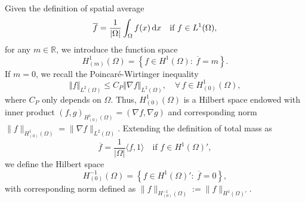 \documentclass[11pt,reqno]{amsart}
\theoremstyle{remark}
\newcommand \norm[1] {\left\Vert #1\right\Vert}
\def\d{{\rm d}}
\def \l {\langle}
\def \r {\rangle}
\numberwithin{equation}{section}
\def\d{{\rm d}}
\begin{document}
Given the definition of spatial average
\begin{equation*}
\overline{f}= \frac{1}{|\Omega|} \int_{\Omega} f(x) \, \d x \quad \text{if } f \in L^1(\Omega),
\end{equation*}
for any $m \in \mathbb{R}$, we introduce the function space
$$
H^1_{(m)}(\Omega)=\left\lbrace f \in H^1(\Omega) : \ \overline{f}=m \right\rbrace \! .
$$
If $m=0$, we recall the Poincar\'{e}-Wirtinger inequality
\begin{equation}\label{poincare} %
\norm{f}_{L^2(\Omega)} \le C_P  \norm{\nabla f}_{L^2(\Omega)} \!, \quad \forall \, f \in H_{(0)}^1(\Omega),
\end{equation}
where $C_P$ only depends on $\Omega$. Thus, 
$H^1_{(0)}(\Omega)$ is a Hilbert space endowed with inner product $(f,g)_{H^1_{(0)}(\Omega)}=(\nabla f, \nabla g)$ and corresponding norm $\| f\|_{H^1_{(0)}(\Omega)}=\| \nabla f \|_{L^2(\Omega)}$.
Extending the definition of total mass as
\begin{equation*}
\overline{f} = \frac{1}{|\Omega|} \l f,1 \r \quad \text{if } f \in H^1(\Omega)',
\end{equation*}
we define the Hilbert space
\begin{equation}
\label{Spazi-mn}
H^{-1}_{(0)}(\Omega)=\left\lbrace f  \in H^1(\Omega)' : \ \overline{f}=0 \right\rbrace \!,
\end{equation}
with corresponding norm defined as $\| f\|_{H^{-1}_{(0)}(\Omega)}:= \| f\|_{H^1(\Omega)'}$.
\end{document}
